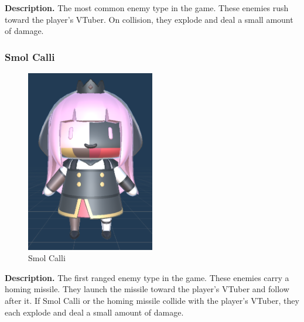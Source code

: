 \documentclass[10pt, a4paper]{article}
\begin{document}
	\textbf{Description.} The most common enemy type in the game. These enemies rush toward the player's VTuber. On collision, they explode and deal a small amount of damage.

	\goodbreak

	\subsubsection{Smol Calli}

	\begin{figure}[H]
		\centering
		\includegraphics[width=0.5\textwidth]{images/smol_calli1.png}
		\caption{Smol Calli}
		\label{fig:smolcalli}
	\end{figure}

	\textbf{Description.} The first ranged enemy type in the game. These enemies carry a homing missile. They launch the missile toward the player's VTuber and follow after it. If Smol Calli or the homing missile collide with the player's VTuber, they each explode and deal a small amount of damage.

  	
\end{document}
